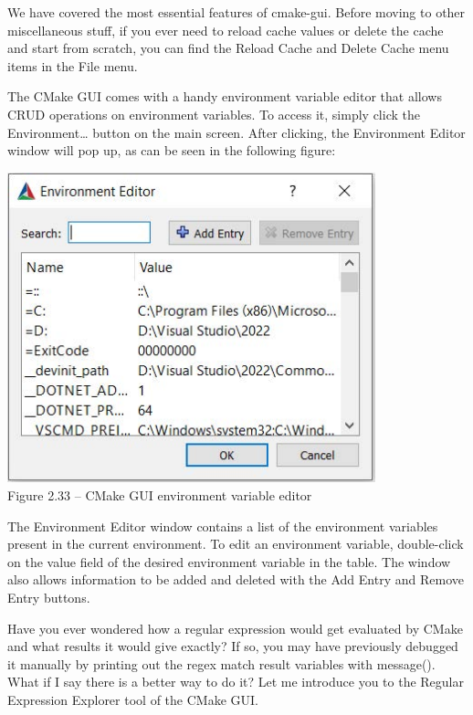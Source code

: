 We have covered the most essential features of cmake-gui. Before moving to other miscellaneous stuff, if you ever need to reload cache values or delete the cache and start from scratch, you can find the Reload Cache and Delete Cache menu items in the File menu.


The CMake GUI comes with a handy environment variable editor that allows CRUD operations on environment variables. To access it, simply click the Environment… button on the main screen. After clicking, the Environment Editor window will pop up, as can be seen in the following figure:

\begin{center}
\includegraphics[width=0.8\textwidth]{content/1/chapter2/images/33.jpg}\\
Figure 2.33 – CMake GUI environment variable editor
\end{center}

The Environment Editor window contains a list of the environment variables present in the current environment. To edit an environment variable, double-click on the value field of the desired environment variable in the table. The window also allows information to be added and deleted with the Add Entry and Remove Entry buttons.


Have you ever wondered how a regular expression would get evaluated by CMake and what results it would give exactly? If so, you may have previously debugged it manually by printing out the regex match result variables with message(). What if I say there is a better way to do it? Let me introduce you to the Regular Expression Explorer tool of the CMake GUI.

